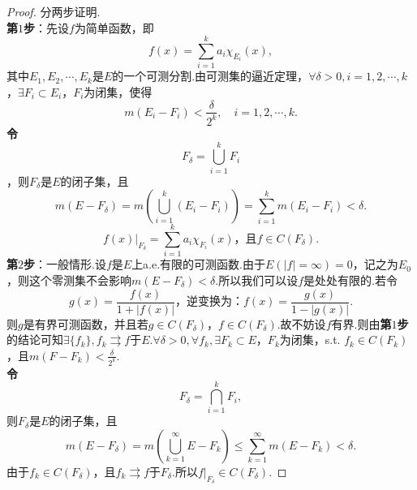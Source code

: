 \documentclass[bwprint, withoutpreface]{cumcmthesis}
\begin{document}
\begin{proof}
	分两步证明. \\
	\textbf{第$1$步}：先设$f$为简单函数，即
	\begin{equation*}
		f(x) = \sum_{i = 1}^{k}{a_i \chi_{E_i}(x)},
	\end{equation*}
	其中$E_1, E_2, \cdots, E_k$是$E$的一个可测分割.由可测集的逼近定理，$\forall \delta > 0, i = 1, 2, \cdots, k$，$\exists F_i \subset E_i$，$F_i$为闭集，使得
	\begin{equation*}
		m(E_i - F_i) < \frac{\delta}{2^k}, \quad i = 1, 2, \cdots, k.
	\end{equation*}
	\textbf{令\[F_{\delta} = \bigcup_{i = 1}^{k}{F_i}\]}，则$F_{\delta}$是$E$的闭子集，且
	\begin{equation*}
		m(E - F_{\delta}) = m(\bigcup_{i = 1}^{k}{(E_i - F_i)}) = \sum_{i = 1}^{k}{m(E_i - F_i)} < \delta.
	\end{equation*}
	\begin{equation*}
		f(x)|_{F_{\delta}} = \sum_{i = 1}^{k}{a_i \chi_{F_i}(x)} \mbox{，且$f \in C(F_{\delta})$}.
	\end{equation*}
	\textbf{第$2$步}：一般情形.设$f$是$E$上a.e.有限的可测函数.由于$E(|f| = \infty) = 0$，记之为$E_0$，则这个零测集不会影响$m(E - F_{\delta}) < \delta$.所以我们可以设$f$是处处有限的.若令
	\begin{equation*}
		g(x) = \frac{f(x)}{1 + |f(x)|} \mbox{，逆变换为：} f(x) = \frac{g(x)}{1 - |g(x)|}.
	\end{equation*}
	则$g$是有界可测函数，并且若$g \in C(F_{\delta})$，$f \in C(F_{\delta})$.故不妨设$f$有界.则由\textbf{第$1$步}的结论可知$\exists \{f_k\}, f_k \rightrightarrows f \mbox{于}E$.$\forall \delta > 0, \forall f_k, \exists F_k \subset E$，$F_k$为闭集，s.t. $f_k \in C(F_k)$，且$m(F - F_k) < \frac{\delta}{2^k}$. \\
	\textbf{令\[F_{\delta} = \bigcap_{i = 1}^{k}{F_i},\]}则$F_{\delta}$是$E$的闭子集，且
	\begin{equation*}
		m(E - F_{\delta}) = m(\bigcup_{k = 1}^{\infty}{E - F_k}) \leqslant \sum_{k = 1}^{\infty}{m(E - F_k)} < \delta.
	\end{equation*}
	由于$f_k \in C(F_{\delta})$，且$f_k \rightrightarrows f \mbox{于}F_{\delta}$.所以$f|_{F_{\delta}} \in C(F_{\delta})$.
\end{proof}
\end{document}
